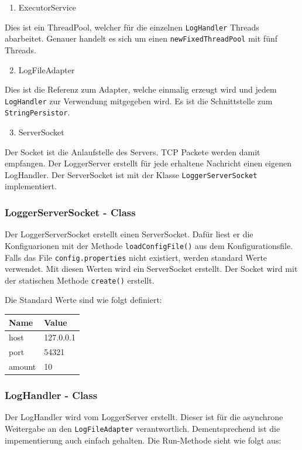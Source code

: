 \documentclass[12pt,a4paper,twosided]{scrartcl}
\begin{document}
\begin{enumerate}
	\item ExecutorService
\end{enumerate}

Dies ist ein ThreadPool, welcher für die einzelnen \texttt{LogHandler} Threads abarbeitet. Genauer handelt es sich um einen \texttt{newFixedThreadPool} mit fünf Threads.

\begin{enumerate}
	\setcounter{enumi}{1}
	\item LogFileAdapter
\end{enumerate}

Dies ist die Referenz zum Adapter, welche einmalig erzeugt wird und jedem \texttt{LogHandler} zur Verwendung mitgegeben wird. Es ist die Schnittstelle zum \texttt{StringPersistor}.

\begin{enumerate}
	\setcounter{enumi}{2}
	\item ServerSocket
\end{enumerate} 

Der Socket ist die Anlaufstelle des Servers. TCP Packete werden damit empfangen. Der LoggerServer erstellt für jede erhaltene Nachricht einen eigenen LogHandler. Der ServerSocket ist mit der Klasse \texttt{LoggerServerSocket} implementiert.

\subsubsection{LoggerServerSocket - Class}
Der LoggerServerSocket erstellt einen ServerSocket. Dafür liest er die Konfiguarionen mit der Methode \texttt{loadConfigFile()} aus dem Konfigurationsfile. Falls das File \texttt{config.properties} nicht existiert, werden standard Werte verwendet. Mit diesen Werten wird ein ServerSocket erstellt. Der Socket wird mit der statischen Methode \texttt{create()} erstellt.

Die Standard Werte sind wie folgt definiert:

\begin{tabular}{|l|l|}
	\hline \textbf{Name}   & \textbf{Value}     \\ \hline
	host   & 127.0.0.1 \\ \hline
	port   & 54321     \\ \hline
	amount & 10        \\ \hline
\end{tabular}

\subsubsection{LogHandler - Class}
Der LogHandler wird vom LoggerServer erstellt. Dieser ist für die asynchrone Weitergabe an den \texttt{LogFileAdapter} verantwortlich. Dementsprechend ist die impementierung auch einfach gehalten. Die Run-Methode sieht wie folgt aus:
\end{document}
